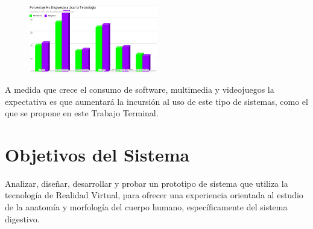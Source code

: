 \begin{figure}[H]
	\begin{center}
 		\includegraphics[width = 0.5\textwidth]{v3/images/chart1.png}
	\end{center} 
\end{figure}
A medida que crece el consumo de software, multimedia y videojuegos la expectativa es que aumentará la incursión al uso de este tipo  de sistemas, como el que se propone en este Trabajo Terminal.



\section{Objetivos del Sistema}
Analizar, diseñar, desarrollar y probar un prototipo de sistema que utiliza la tecnología de Realidad Virtual, para ofrecer una experiencia orientada al estudio 
de la anatomía y morfología del cuerpo humano, específicamente del sistema digestivo.\\
